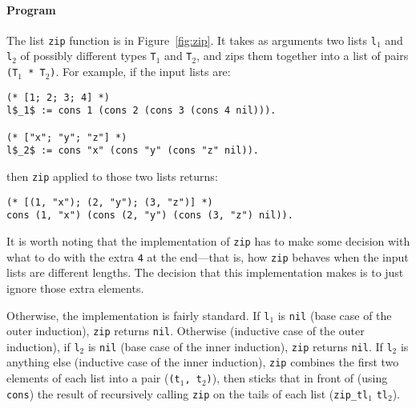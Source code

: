 \paragraph{Program} The list \lstinline{zip} function is in Figure~\ref{fig:zip}.
It takes as arguments two lists \lstinline{l}$_1$ and \lstinline{l}$_2$ of possibly different types \lstinline{T}$_1$ and \lstinline{T}$_2$, and zips them together into
a list of pairs \lstinline{(T}$_1$\lstinline{ * T}$_2$\lstinline{)}.
For example, if the input lists are: %

\begin{lstlisting}
(* [1; 2; 3; 4] *)
l$_1$ := cons 1 (cons 2 (cons 3 (cons 4 nil))).

(* ["x"; "y"; "z"] *)
l$_2$ := cons "x" (cons "y" (cons "z" nil)).
\end{lstlisting}
then \lstinline{zip} applied to those two lists returns:

\begin{lstlisting}
(* [(1, "x"); (2, "y"); (3, "z")] *)
cons (1, "x") (cons (2, "y") (cons (3, "z") nil)).
\end{lstlisting}
It is worth noting that the implementation of \lstinline{zip} has to make some decision with
what to do with the extra \lstinline{4} at the end---that is, how \lstinline{zip} behaves when the input
lists are different lengths.
The decision that this implementation makes is to just ignore those extra elements.

Otherwise, the implementation is fairly standard.
If \lstinline{l}$_1$ is \lstinline{nil} (base case of the outer induction),
\lstinline{zip} returns \lstinline{nil}.
Otherwise (inductive case of the outer induction),
if \lstinline{l}$_2$ is \lstinline{nil} (base case of the inner induction),
\lstinline{zip} returns \lstinline{nil}.
If \lstinline{l}$_2$ is anything else (inductive case of the inner induction),
\lstinline{zip} combines the first two elements of each list into a pair (\lstinline{(t}$_1$\lstinline{, t}$_2$\lstinline{)}),
then sticks that in front of (using \lstinline{cons}) the result of recursively calling \lstinline{zip} on the tails of each list
(\lstinline{zip_tl}$_1$ \lstinline{tl}$_2$). %

